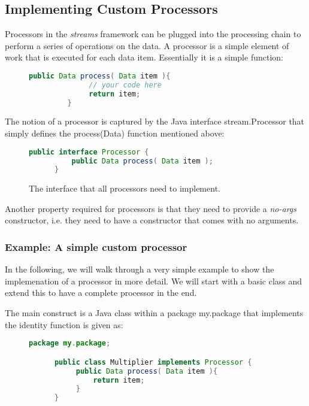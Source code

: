 
\subsection{\label{sec:customProcessors}Implementing Custom Processors}
Processors in the {\em streams} framework can be plugged into the
processing chain to perform a series of operations on the data.  A
processor is a simple element of work that is executed for each data
item. Essentially it is a simple function:

\begin{figure}[h!]
   \centering 
   \begin{lstlisting}[language=Java]
         public Data process( Data item ){
              // your code here
              return item;
         }
   \end{lstlisting}
\end{figure}

The notion of a processor is captured by the Java interface {\ttfamily
stream.Processor} that simply defines the {\ttfamily process(Data)}
function mentioned above:

\begin{figure}[h!]
  \centering
  \begin{lstlisting}[language=Java]
      public interface Processor {
          public Data process( Data item );
      }
  \end{lstlisting}
  \caption{\label{fig:processorInterface}The interface that all processors need to implement.}
\end{figure}

Another property required for processors is that they need to provide
a {\em no-args} constructor, i.e. they need to have a constructor that
comes with no arguments.


\subsubsection{\label{sec:exampleProcessor}Example: A simple custom processor}
In the following, we will walk through a very simple example to show
the implemenation of a processor in more detail. We will start with a
basic class and extend this to have a complete processor in the end.

The main construct is a Java class within a package {\ttfamily my.package}
that implements the identity function is given as:

\begin{figure}[h!]
  \centering
  \begin{lstlisting}[language=Java]
      package my.package;

      public class Multiplier implements Processor {
           public Data process( Data item ){
               return item;
           }
      }
  \end{lstlisting}
\end{figure}

